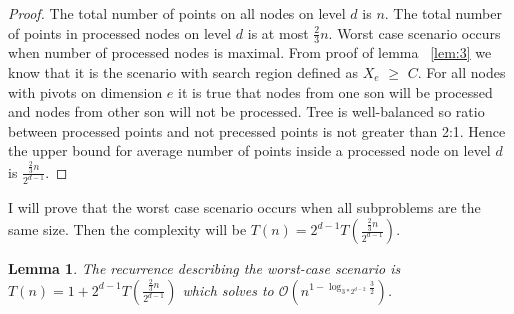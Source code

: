 \documentclass[10pt,a4paper]{article}
\newtheorem{lemma}{Lemma}
\newcommand{\Oh}{\mathcal{O}}
\begin{document}
\begin{proof}

The total number of points on all nodes on level $d$ is $n$. The total number of points in processed nodes on level $d$ is at most $\frac{2}{3}n$. Worst case scenario occurs when number of processed nodes is maximal. From proof of lemma ~\ref{lem:3} we know that it is the scenario with search region defined as $X_e$ $\geq$ $C$. For all nodes with pivots on dimension $e$ it is true that nodes from one son will be processed and nodes from other son will not be processed. Tree is well-balanced so ratio between processed points and not precessed points is not greater than 2:1. Hence the upper bound for average number of points inside a processed node on level $d$ is $\frac{\frac{2}{3}n}{2^{d-1}}$.
\end{proof}

I will prove that the worst case scenario occurs when all subproblems are the same size. Then the complexity will be $T(n)=2^{d-1}T(\frac{\frac{2}{3}n}{2^{d-1}})$.

\begin{lemma}\label{lem:5}
The recurrence describing the worst-case scenario is $T(n)=1+2^{d-1}T(\frac{\frac{2}{3}n}{2^{d-1}})$ which solves to $\Oh(n^{1 - \log_{3*2^{d-2}}{\frac{3}{2}}})$.
\end{lemma}
\end{document}
